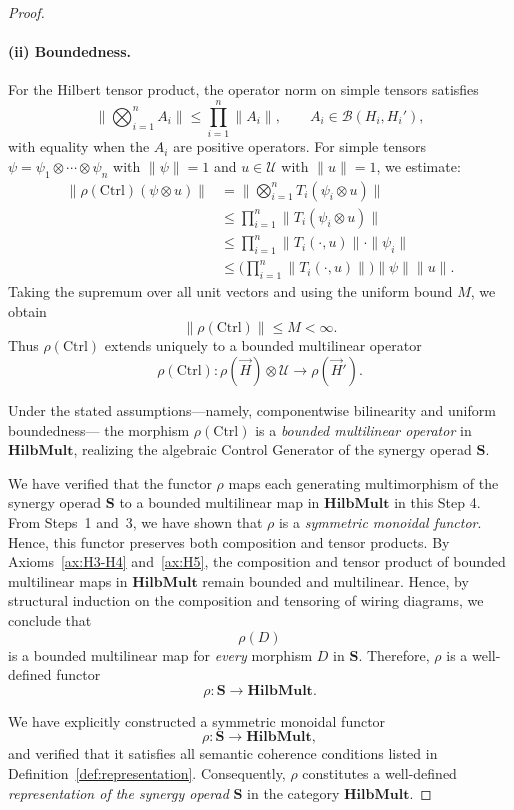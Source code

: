 \documentclass[11pt]{article}
\begin{document}
\begin{proof}
\begin{enumerate}[label=(\alph*)]
\paragraph{(ii) Boundedness.}
For the Hilbert tensor product, the operator norm on simple tensors satisfies
\[
\Big\| \bigotimes_{i=1}^n A_i \Big\| \le \prod_{i=1}^n \|A_i\|,
\qquad A_i \in \mathcal{B}(H_i, H_i'),
\]
with equality when the $A_i$ are positive operators. For simple tensors $\psi = \psi_1 \otimes \cdots \otimes \psi_n$ with $\|\psi\| = 1$ and $u \in \mathcal{U}$ with $\|u\| = 1$, we estimate:
\[
\begin{aligned}
\big\| \rho(\mathrm{Ctrl})(\psi \otimes u) \big\|
&= \Big\| \bigotimes_{i=1}^n T_i(\psi_i \otimes u) \Big\| \\
&\le \prod_{i=1}^n \|T_i(\psi_i \otimes u)\| \\
&\le \prod_{i=1}^n \|T_i(\cdot, u)\| \cdot \|\psi_i\| \\
&\le \Big(\prod_{i=1}^n \|T_i(\cdot, u)\|\Big) \|\psi\| \|u\|.
\end{aligned}
\]
Taking the supremum over all unit vectors and using the uniform bound $M$, we obtain
\[
\|\rho(\mathrm{Ctrl})\| \le M < \infty.
\]
Thus $\rho(\mathrm{Ctrl})$ extends uniquely to a bounded multilinear operator
\[
\rho(\mathrm{Ctrl}): \rho(\vec{H}) \otimes \mathcal{U} \longrightarrow \rho(\vec{H}').
\]

Under the stated assumptions—namely, componentwise bilinearity and uniform boundedness—%
the morphism $\rho(\mathrm{Ctrl})$ is a \emph{bounded multilinear operator} in $\mathbf{HilbMult}$, realizing the algebraic Control Generator of the synergy operad $\mathbf{S}$.


\end{enumerate}


We have verified that the functor $\rho$ maps each generating multimorphism of the synergy operad $\mathbf{S}$ to a bounded multilinear map in $\mathbf{HilbMult}$ in this Step 4. From Steps~1 and~3, we have shown that $\rho$ is a \emph{symmetric monoidal functor}. Hence, this functor preserves both composition and tensor products.  By Axioms~\ref{ax:H3-H4} and~\ref{ax:H5}, the composition and tensor product of bounded multilinear maps in $\mathbf{HilbMult}$ remain bounded and multilinear.  
Hence, by structural induction on the composition and tensoring of wiring diagrams, we conclude that
\[
\rho(D)
\]
is a bounded multilinear map for \emph{every} morphism $D$ in $\mathbf{S}$.  
Therefore, $\rho$ is a well-defined functor
\[
\rho: \mathbf{S} \longrightarrow \mathbf{HilbMult}.
\]

We have explicitly constructed a symmetric monoidal functor
\[
\rho: \mathbf{S} \longrightarrow \mathbf{HilbMult},
\]
and verified that it satisfies all semantic coherence conditions listed in Definition~\ref{def:representation}.  
Consequently, $\rho$ constitutes a well-defined \emph{representation of the synergy operad} $\mathbf{S}$ in the category $\mathbf{HilbMult}$.
%
\end{proof}
\end{document}
